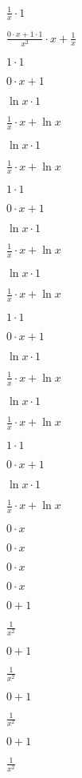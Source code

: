 $ \frac{1}{x}  \cdot 1$

$ \frac{0 \cdot x+1 \cdot 1}{x^{2}}  \cdot x+ \frac{1}{x} $

$1 \cdot 1$

$0 \cdot x+1$

$ \ln x \cdot 1$

$ \frac{1}{x}  \cdot x+ \ln x$

$ \ln x \cdot 1$

$ \frac{1}{x}  \cdot x+ \ln x$

$1 \cdot 1$

$0 \cdot x+1$

$ \ln x \cdot 1$

$ \frac{1}{x}  \cdot x+ \ln x$

$ \ln x \cdot 1$

$ \frac{1}{x}  \cdot x+ \ln x$

$1 \cdot 1$

$0 \cdot x+1$

$ \ln x \cdot 1$

$ \frac{1}{x}  \cdot x+ \ln x$

$ \ln x \cdot 1$

$ \frac{1}{x}  \cdot x+ \ln x$

$1 \cdot 1$

$0 \cdot x+1$

$ \ln x \cdot 1$

$ \frac{1}{x}  \cdot x+ \ln x$

$0 \cdot x$

$0 \cdot x$

$0 \cdot x$

$0 \cdot x$

$0+1$

$ \frac{1}{x^{2}} $

$0+1$

$ \frac{1}{x^{2}} $

$0+1$

$ \frac{1}{x^{2}} $

$0+1$

$ \frac{1}{x^{2}} $

